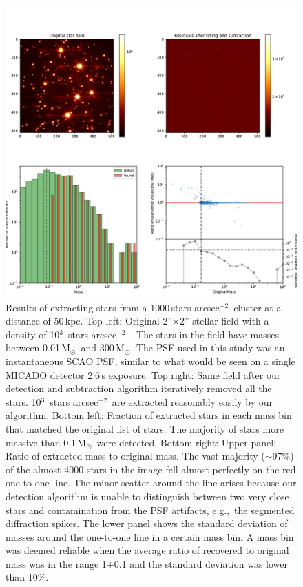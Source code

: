 \documentclass{aa}
\newcommand{\msun}{M$_\odot$~}
\newcommand{\msune}{M$_\odot$}
\newcommand{\s}{$\sim$}
\newcommand{\h}[1]{$^{#1}$}
\newcommand{\spa}{stars arcsec$^{-2}$~}
\begin{document}
\begin{appendix}
\begin{figure}
    \centering
    \includegraphics[width=\textwidth]{tbl_stats_dist=50000_rho=1000.pdf}
    \caption{Results of extracting stars from a 1000\,\spa cluster at a distance of 50\,kpc.
    Top left: Original 2''$\times$2'' stellar field with a density of 10\h3~\spa.
    The stars in the field have masses between 0.01\,\msun and 300\,\msune.
    The PSF used in this study was an instantaneous SCAO PSF, similar to what would be seen on a single MICADO detector 2.6\,s exposure.
    Top right: Same field after our detection and subtraction algorithm iteratively removed all the stars.
    10\h3~\spa are extracted reasonably easily by our algorithm.
    Bottom left: Fraction of extracted stars in each mass bin that matched the original list of stars.
    The majority of stars more massive than 0.1\,\msun were detected.
    Bottom right: Upper panel: Ratio of extracted mass to original mass.
    The vast majority (\s97\%) of the almost 4000 stars in the image fell almost perfectly on the red one-to-one line.
    The minor scatter around the line arises because our detection algorithm is unable to distinguish between two very close stars and contamination from the PSF artifacts, e.g.,\ the segmented diffraction spikes.
    The lower panel shows the standard deviation of masses around the one-to-one line in a certain mass bin.
    A mass bin was deemed reliable when the average ratio of recovered to original mass was in the range 1$\pm$0.1 and the standard deviation was lower than 10\%.}


\end{figure}
\end{appendix}
\end{document}
